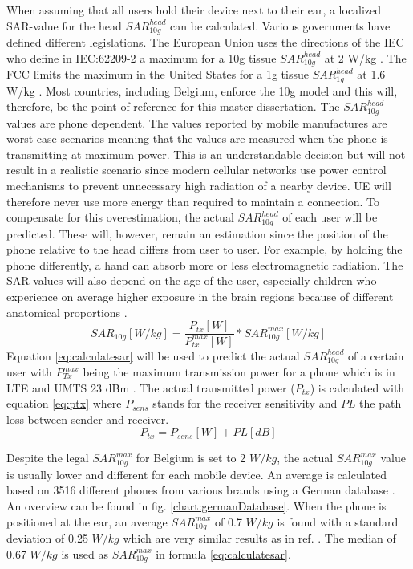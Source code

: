 When assuming that all users hold their device next to their ear, a localized SAR-value for the head $SAR^{head}_{10g}$ can be calculated.
Various governments have defined different legislations.
The European Union uses the directions of the  \acs{IEC} who
 define in IEC:62209-2 a maximum for a 10g tissue $SAR^{head}_{10g}$ at 2 W/kg \cite{J23}.
The \acs{FCC} limits the maximum in the United States for a 1g tissue $SAR^{head}_{1g}$ at 1.6 W/kg \cite{S15_SARFCC}.
Most countries, including Belgium, enforce the 10g model and this will, therefore, be the point of reference for this master dissertation.
The $SAR^{head}_{10g}$ values are phone dependent. The values reported by mobile manufactures are worst-case scenarios meaning that the 
values are measured when the phone is transmitting at maximum power. This is an understandable decision but will not result in a realistic scenario since 
modern cellular networks use power control mechanisms to prevent unnecessary high radiation of a nearby device. \gls{UE} will therefore never use more energy than 
required to maintain a connection.
To compensate for this overestimation, the actual $SAR^{head}_{10g}$ of each user will be predicted. These will, however, remain an estimation since the 
position of the phone relative to the head differs from user to user. For example, by holding the phone differently, a hand can absorb more or less 
electromagnetic radiation. The \gls{SAR} values will also depend on the age of the user, especially children who experience on average higher exposure in 
the brain regions because of different anatomical proportions \cite{J26_SARtissueage, J10_RDP}.
\begin{equation}
{SAR}_{10g}[W/kg] = \frac{P_{tx} [W]}{P^{max}_{tx} [W]} * {SAR}^{max}_{10g} [W/kg]
\label{eq:calculatesar}
\end{equation}
Equation \ref{eq:calculatesar} will be used to predict the actual $SAR^{head}_{10g}$  of a certain user with 
$P^{max}_{Tx}$ being the maximum transmission power for a phone which is in \gls{LTE} and UMTS 23 dBm \cite{J11_maxTpxUE, J10_RDP}.
The actual transmitted power ($P_{tx}$) is calculated with equation \ref{eq:ptx} where $P_{sens}$
stands for the receiver sensitivity and $PL$ the path loss between sender and receiver.
\begin{equation}
P_{tx} = P_{sens} [W] + PL [dB]
\label{eq:ptx}
\end{equation}
 
Despite the legal $SAR^{max}_{10g}$ for Belgium is set to 2 $W/kg$,  the actual  $SAR^{max}_{10g}$ value is usually lower and different for each mobile device. 
An average is calculated based on 3516 different phones from various brands using a German database \cite{SARDatabase}. An overview can be 
found in fig. \ref{chart:germanDatabase}.
When the phone is positioned at the ear, an average $SAR^{max}_{10g}$  of 0.7 $W/kg$ is found with a standard deviation of 0.25 $W/kg$ which are very similar 
results as in ref. \cite{j10.1.1}. The median of 0.67  $W/kg$ is used as $SAR^{max}_{10g}$ in formula \ref{eq:calculatesar}.


